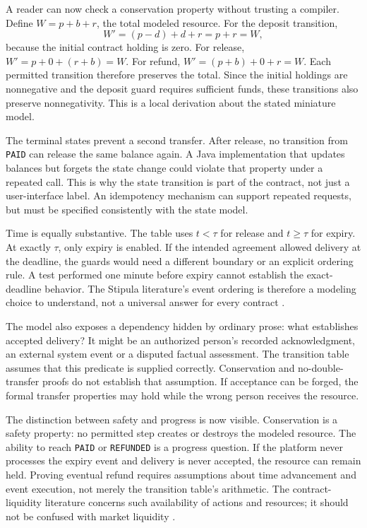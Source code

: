 \documentclass[12pt,a4paper,oneside,openany]{book}
\begin{document}
A reader can now check a conservation property without trusting a compiler. Define
$W=p+b+r$, the total modeled resource. For the deposit transition,
\begin{equation}
 W'=(p-d)+d+r=p+r=W,
 \label{eq:escrow-deposit}
\end{equation}
because the initial contract holding is zero. For release,
$W'=p+0+(r+b)=W$. For refund, $W'=(p+b)+0+r=W$. Each permitted transition therefore
preserves the total. Since the initial holdings are nonnegative and the deposit
guard requires sufficient funds, these transitions also preserve nonnegativity.
This is a local derivation about the stated miniature model.

The terminal states prevent a second transfer. After release, no transition from
\texttt{PAID} can release the same balance again. A Java implementation that
updates balances but forgets the state change could violate that property under
a repeated call. This is why the state transition is part of the contract, not
just a user-interface label. An idempotency mechanism can support repeated
requests, but must be specified consistently with the state model.

Time is equally substantive. The table uses $t<\tau$ for release and
$t\geq\tau$ for expiry. At exactly $\tau$, only expiry is enabled. If the intended
agreement allowed delivery at the deadline, the guards would need a different
boundary or an explicit ordering rule. A test performed one minute before expiry
cannot establish the exact-deadline behavior. The Stipula literature's event
ordering is therefore a modeling choice to understand, not a universal answer
for every contract \citep{stipula2021}.

The model also exposes a dependency hidden by ordinary prose: what establishes
accepted delivery? It might be an authorized person's recorded acknowledgment,
an external system event or a disputed factual assessment. The transition table
assumes that this predicate is supplied correctly. Conservation and no-double-
transfer proofs do not establish that assumption. If acceptance can be forged,
the formal transfer properties may hold while the wrong person receives the
resource.

The distinction between safety and progress is now visible. Conservation is a
safety property: no permitted step creates or destroys the modeled resource.
The ability to reach \texttt{PAID} or \texttt{REFUNDED} is a progress question.
If the platform never processes the expiry event and delivery is never accepted,
the resource can remain held. Proving eventual refund requires assumptions about
time advancement and event execution, not merely the transition table's arithmetic.
The contract-liquidity literature concerns such availability of actions and
resources; it should not be confused with market liquidity \citep{liquidity2023}.
\end{document}
